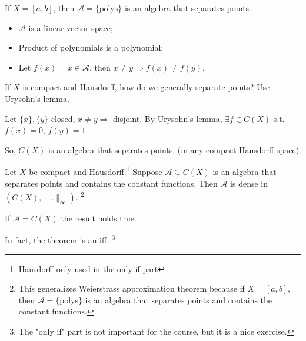 \begin{exmp}
    If $X = [a, b]$, then $\mathcal{A} = \{ \text{polys} \}$ is an algebra that separates points.
    \begin{itemize}
        \item $\mathcal{A}$ is a linear vector space;
        \item Product of polynomials is a polynomial;
        \item Let $f(x) = x \in \mathcal{A}$, then $ x \neq y \Rightarrow f(x) \neq f(y)$.   
    \end{itemize}
\end{exmp}

\begin{rem}
    If $X$ is compact and Hausdorff, how do we generally separate points? Use Urysohn's lemma.
    
    Let $\{x\}, \{y \}$ closed, $x \neq y \Rightarrow$ disjoint.
    By Urysohn's lemma, $\exists f \in C(X)$ s.t. $f(x) = 0$, $f(y) = 1$. 
    
    So, $C(X)$ is an algebra that separates points. (in any compact Hausdorff space).
\end{rem}

\begin{thm} 
    Let $X$ be compact and Hausdorff.\footnote{Hausdorff only used in the only if part} 
    Suppose $\mathcal{A} \subseteq C(X)$ is an algebra that separates 
    points and contains the constant functions. Then $\mathcal{A}$ is dense in $(C(X), \| . \|_{\infty} )$.
    \footnote{This generalizes Weierstrass approximation theorem because if $X = [a, b]$, then 
    $\mathcal{A} = \{ \text{polys} \}$ is an algebra that separates points and contains the constant 
    functions.}
\end{thm}

\begin{rem}
    If $\mathcal{A} = C(X)$ the result holds true.  
\end{rem}

\begin{rem}
    In fact, the theorem is an iff. \footnote{The "only if" part is not important for the course, but it is a nice exercise.}
\end{rem}

